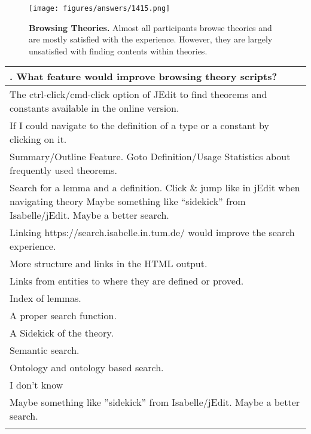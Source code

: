\documentclass[bsc,frontabs,oneside,singlespacing,parskip,deptreport,logo]{infthesis}
\begin{document}
\begin{figure}[h]
    \centering
    \texttt{[image: figures/answers/1415.png]}
    \caption{\textbf{Browsing Theories.}
    Almost all participants browse theories and are mostly satisfied with the experience. However, they are largely unsatisfied with finding contents within theories.}
    \label{fig:theory-scripts-1}
    \medskip
\end{figure}

\begin{table}[h!]
\centering
{}
\begin{tabularx}{\textwidth}{X}
{\sf 16. What feature would improve browsing theory scripts?}
\vspace{0.3cm}\\ 
\hline
\footnotesize
The ctrl-click/cmd-click option of JEdit to find theorems and constants available in the online version.\\
\footnotesize
If I could navigate to the definition of a type or a constant by clicking on it.\\
\footnotesize
Summary/Outline Feature. Goto Definition/Usage Statistics about frequently used theorems.\\
\footnotesize
Search for a lemma and a definition. Click \& jump like in jEdit when navigating theory
\footnotesize
Maybe something like ``sidekick''  from Isabelle/jEdit. Maybe a better search.\\
\footnotesize
Linking https://search.isabelle.in.tum.de/ would improve the search experience.\\
\footnotesize
More structure and links in the HTML output.\\
\footnotesize
Links from entities to where they are defined or proved.\\
\footnotesize
Index of lemmas.\\
\footnotesize
A proper search function. \\ 
\footnotesize
A Sidekick of the theory.\\
\footnotesize
Semantic search.\\
\footnotesize
Ontology and ontology based search.\\
\footnotesize
I don't know\\
\footnotesize
Maybe something like ''sidekick'' from Isabelle/jEdit. Maybe a better search.\\
\footnotesize

\end{tabularx}
\end{table}
\end{document}

